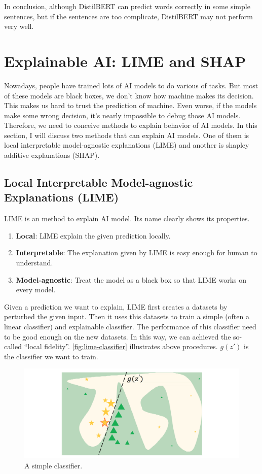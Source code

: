 \documentclass{article}[12pt]
\begin{document}
In conclusion, although DistilBERT can predict words correctly in some simple sentences, but if the sentences are too complicate, DistilBERT may not perform very well.

\section{Explainable AI: LIME and SHAP}

Nowadays, people have trained lots of AI models to do various of tasks. But most of these models are black boxes, we don't know how machine makes its decision. This makes us hard to trust the prediction of machine. Even worse, if the models make some wrong decision, it's nearly impossible to debug those AI models. Therefore, we need to conceive methods to explain behavior of AI models. In this section, I will discuss two methods that can explain AI models. One of them is local interpretable model-agnostic explanations (LIME) and another is shapley additive explanations (SHAP).

\subsection{Local Interpretable Model-agnostic Explanations (LIME)}

LIME is an method to explain AI model. Its name clearly shows its properties.

\begin{enumerate}
	\item \textbf{Local}: LIME explain the given prediction locally.
	\item \textbf{Interpretable}: The explanation given by LIME is easy enough for human to understand.
	\item \textbf{Model-agnostic}: Treat the model as a black box so that LIME works on every model.
\end{enumerate}

Given a prediction we want to explain, LIME first creates a datasets by perturbed the given input. Then it uses this datasets to train a simple (often a linear classifier) and explainable classifier. The performance of this classifier need to be good enough on the new datasets. In this way, we can achieved the so-called ``local fidelity''. \autoref{fig:lime-classifier} illustrates above procedures. $g(z')$ is the classifier we want to train.

\begin{figure}[htbp]
	\centering
	\includegraphics[width=0.7\linewidth]{figure/lime-classifier}
	\caption[]{A simple classifier.\footnotemark}
	\label{fig:lime-classifier}
\end{figure}
\end{document}
